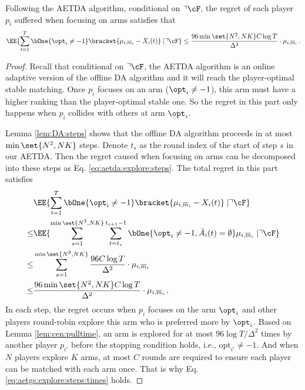\begin{lemma}\label{lem:aetda:collision}
    Following the AETDA algorithm, conditional on $\urcorner \cF$,  the regret of each player $p_i$ suffered when focusing on arms satisfies that 
    \begin{align*}
        \EE{\sum_{t=1}^T \bOne{\opt_i \neq -1}\bracket{\mu_{i,\overline{m}_i} - X_{i}(t)} \mid 
    \urcorner \cF } \le  \frac{96\min\set{N^2, NK} C\log T}{\Delta^2}\cdot \mu_{i,\overline{m}_i} \,.
    \end{align*}
\end{lemma}

\begin{proof}
Recall that conditional on $\urcorner \cF$, the AETDA algorithm is an online adaptive version of the offline DA algorithm and it will reach the player-optimal stable matching. 
Once $p_i$ focuses on an arm ($\opt_i\neq -1$), this arm must have a higher ranking than the player-optimal stable one.
So the regret in this part only happens when $p_i$ collides with others at arm $\opt_i$. 

Lemma \ref{lem:DA:steps} shows that the offline DA algorithm proceeds in at most $\min\set{N^2, NK}$ steps. Denote $t_s$ as the round index of the start of step $s$ in our AETDA. Then the regret caused when focusing on arms can be decomposed into these steps as Eq. \eqref{eq:aetda:explore:steps}. 
The total regret in this part satisfies
\begin{align}
        & \EE{\sum_{t=1}^T \bOne{\opt_i \neq -1}\bracket{\mu_{i,\overline{m}_i} - X_{i}(t)} \mid 
    \urcorner \cF } \notag \\ \le& \EE{\sum_{s=1}^{\min\set{N^2, NK}} \sum_{t=t_{s}}^{t_{s+1}-1} \bOne{\opt_i \neq -1, \bar{A}_i(t)=\emptyset} \mu_{i,\overline{m}_i} \mid \urcorner \cF } \label{eq:aetda:explore:steps} \\
        \le & \sum_{s=1}^{\min\set{N^2, NK}} \frac{96C\log T}{\Delta^2}\cdot \mu_{i,\overline{m}_i} \label{eq:aetgs:explore:steps:times} \\
        \le& \frac{96\min\set{N^2, NK} C\log T}{\Delta^2}\cdot \mu_{i,\overline{m}_i} \notag \,. 
    \end{align}
In each step, the regret occurs when $p_i$ focuses on the arm $\opt_i$ and other players round-robin explore this arm who is preferred more by $\opt_i$. Based on Lemma \ref{lem:cen:pulltime}, an arm is explored for at most $96\log T/\Delta^2$ times by another player $p_{i'}$ before the stopping condition holds, i.e., $\mathrm{opt}_{i'}\neq -1$. 
And when $N$ players explore $K$ arms, at most $C$ rounds are required to ensure each player can be matched with each arm once. 
That is why Eq. \eqref{eq:aetgs:explore:steps:times} holds. 
\end{proof}






